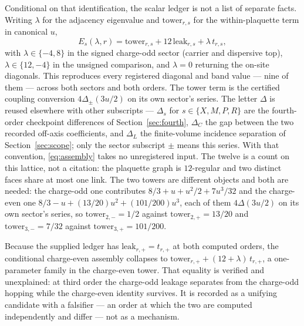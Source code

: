 \documentclass[11pt]{article}
\theoremstyle{plain}
\theoremstyle{definition}
\theoremstyle{remark}
\newcommand{\chk}[1]{}
\begin{document}
Conditional on that identification, the scalar ledger is not a list of
separate facts. Writing $\lambda$ for the
adjacency eigenvalue and $\mathrm{tower}_{r,s}$ for the within-plaquette term
in canonical $u$,
\begin{equation}\label{eq:assembly}
  E_s(\lambda,r)=\mathrm{tower}_{r,s}+12\,\mathrm{leak}_{r,s}+\lambda\,t_{r,s},
\end{equation}
with $\lambda\in\{-4,8\}$ in the signed charge-odd sector (carrier and dispersive
top), $\lambda\in\{12,-4\}$ in the unsigned comparison, and $\lambda=0$
returning the on-site diagonals. This reproduces every registered diagonal
and band value --- nine of them --- across both sectors and both orders. The
tower term is the certified coupling conversion $4\Delta_\pm(3u/2)$ on its own
sector's series. The letter $\Delta$ is reused elsewhere with other
subscripts --- $\Delta_s$ for $s\in\{X,M,P,R\}$ are the fourth-order
checkpoint differences of Section~\ref{sec:fourth}, $\Delta_C$ the gap between
the two recorded off-axis coefficients, and $\Delta_L$ the finite-volume
incidence separation of Section~\ref{sec:scope}; only the sector subscript
$\pm$ means this series. With that convention,
\eqref{eq:assembly} takes no unregistered input. The twelve is a count on this
lattice, not a citation: the plaquette graph is $12$-regular and two distinct
faces share at most one link. The two towers are different objects and both
are needed: the charge-odd one contributes
$8/3+u+u^2/2+7u^3/32$ and the charge-even one $8/3-u+(13/20)u^2+(101/200)u^3$,
each of them $4\Delta(3u/2)$ on its own sector's series, so
$\mathrm{tower}_{2,-}=1/2$ against $\mathrm{tower}_{2,+}=13/20$ and
$\mathrm{tower}_{3,-}=7/32$ against $\mathrm{tower}_{3,+}=101/200$.
\chk{one assembly formula gives every registered band value}
\chk{one assembly formula gives every C-even value at both orders}
\chk{the plaquette graph is 12-regular and two faces share at most one link}

Because the supplied ledger has $\mathrm{leak}_{r,+}=t_{r,+}$ at both computed
orders, the conditional charge-even assembly collapses to
$\mathrm{tower}_{r,+}+(12+\lambda)\,t_{r,+}$, a one-parameter family in the
charge-even tower. That
equality is verified and unexplained: at third order the charge-odd leakage
separates from the charge-odd hopping while the charge-even identity survives.
It is recorded as a unifying candidate with a falsifier --- an order at which
the two are computed independently and differ --- not as a mechanism.
\chk{both declared coincidences, checked: one is ell\_N at all ranks, the other is bare}
\end{document}
